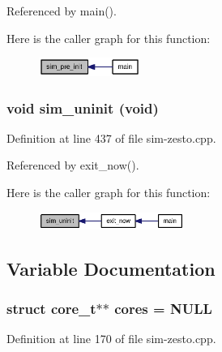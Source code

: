 Referenced by main().

Here is the caller graph for this function:\nopagebreak
\begin{figure}[H]
\begin{center}
\leavevmode
\includegraphics[width=94pt]{sim-zesto_8cpp_6f8bfcc0d1d039d6fb378af082656f6f_icgraph}
\end{center}
\end{figure}
\subsubsection[{sim\_\-uninit}]{\setlength{\rightskip}{0pt plus 5cm}void sim\_\-uninit (void)}\label{sim-zesto_8cpp_12f418d794abd0896d834c9582373b00}




Definition at line 437 of file sim-zesto.cpp.

Referenced by exit\_\-now().

Here is the caller graph for this function:\nopagebreak
\begin{figure}[H]
\begin{center}
\leavevmode
\includegraphics[width=134pt]{sim-zesto_8cpp_12f418d794abd0896d834c9582373b00_icgraph}
\end{center}
\end{figure}


\subsection{Variable Documentation}
\subsubsection[{cores}]{\setlength{\rightskip}{0pt plus 5cm}struct {\bf core\_\-t}$\ast$$\ast$ {\bf cores} = NULL}\label{sim-zesto_8cpp_fd1fbe748ceabf38ef289bb5b346f69a}




Definition at line 170 of file sim-zesto.cpp.

